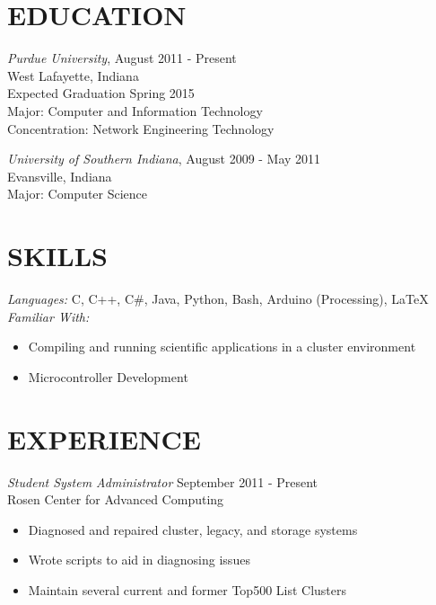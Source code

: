 \documentclass[line,margin]{res}
\begin{document}
\name{\textcolor{OliveGreen}{Ethan Madden}}
\address{maddene@purdue.edu}
\address{(812) 250-1419}
 
\begin{resume}
\section{\textcolor{OliveGreen}{EDUCATION}} 

				{\sl Purdue University}, \hfill August 2011 - Present \\
                West Lafayette, Indiana \\
                Expected Graduation Spring 2015 \\
                Major: Computer and Information Technology \\
                Concentration: Network Engineering Technology 
                
        {\sl University of Southern Indiana}, \hfill August 2009 - May 2011 \\
                Evansville, Indiana \\
                Major: Computer Science
                
 
\section{\textcolor{OliveGreen}{SKILLS}} 
				{\sl Languages:}  C, C++, C\#, Java, Python, Bash, Arduino (Processing), \LaTeX \\
				{\sl Familiar With:} 
                \begin{itemize} \itemsep -2pt %
                  \item Compiling and running scientific applications in a cluster environment
                  \item Microcontroller Development
                \end{itemize}
 
\section{\textcolor{OliveGreen}{EXPERIENCE}} 
				{\sl Student System Administrator} \hfill September 2011 - Present \\
                Rosen Center for Advanced Computing
                \begin{itemize}  \itemsep -2pt %
                  \item Diagnosed and repaired cluster, legacy, and storage systems
                  \item Wrote scripts to aid in diagnosing issues
                  \item Maintain several current and former Top500 List Clusters
                \end{itemize}


\end{resume}
\end{document}
